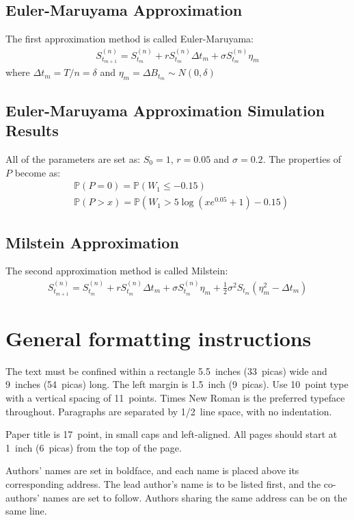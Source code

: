 \documentclass{article} %
\begin{document}
\subsection{Euler-Maruyama Approximation}
The first approximation method is called Euler-Maruyama:
\begin{align}
  S_{t_{m+1}}^{(n)}=S_{t_{m}}^{(n)}+rS_{t_{m}}^{(n)}\Delta t_{m}+\sigma S_{t_{m}}^{(n)}\eta_{m}
\end{align}
where $\Delta t_{m}=T/n=\delta$ and $\eta_{m}=\Delta B_{t_{m}}\sim N(0,\delta)$

\subsection{Euler-Maruyama Approximation Simulation Results}
All of the parameters are set as: $S_{0}=1$, $r=0.05$ and $\sigma=0.2$. The properties of $P$ become as:
\begin{align}
  &\mathbb{P}(P=0)=\mathbb{P}(W_{1}\le -0.15)\\
  &\mathbb{P}(P>x)=\mathbb{P}(W_{1}>5\log(xe^{0.05}+1)-0.15)
\end{align}

\subsection{Milstein Approximation}
The second approximation method is called Milstein:
\begin{align}
  S_{t_{m+1}}^{(n)}=S_{t_{m}}^{(n)}+rS_{t_{m}}^{(n)}\Delta t_{m}+\sigma S_{t_{m}}^{(n)}\eta_{m}+\frac{1}{2}\sigma^{2}S_{t_{m}}(\eta_{m}^{2}-\Delta t_{m})
\end{align}
\section{General formatting instructions}
\label{gen_inst}

The text must be confined within a rectangle 5.5~inches (33~picas) wide and
9~inches (54~picas) long. The left margin is 1.5~inch (9~picas).
Use 10~point type with a vertical spacing of 11~points. Times New Roman is the
preferred typeface throughout. Paragraphs are separated by 1/2~line space,
with no indentation.

Paper title is 17~point, in small caps and left-aligned.
All pages should start at 1~inch (6~picas) from the top of the page.

Authors' names are
set in boldface, and each name is placed above its corresponding
address. The lead author's name is to be listed first, and
the co-authors' names are set to follow. Authors sharing the
same address can be on the same line.
\end{document}
